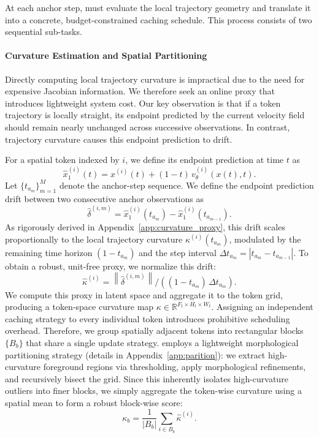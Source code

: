 At each anchor step, \cubic must evaluate the local trajectory geometry and translate it into a concrete, budget-constrained caching schedule. This process consists of two sequential sub-tasks.

\paragraph{Curvature Estimation and Spatial Partitioning}
Directly computing local trajectory curvature is impractical due to the need for expensive Jacobian information. We therefore seek an online proxy that introduces lightweight system cost. Our key observation is that if a token trajectory is locally straight, its endpoint predicted by the current velocity field should remain nearly unchanged across successive observations. In contrast, trajectory curvature causes this endpoint prediction to drift.

For a spatial token indexed by $i$, we define its endpoint prediction at time $t$ as
\begin{equation}
    \hat{x}_1^{(i)}(t) = x^{(i)}(t) + (1 - t)\, v_\theta^{(i)}(x(t), t).
\end{equation}
Let $\{t_{a_m}\}_{m=1}^{M}$ denote the anchor-step sequence. We define the endpoint prediction drift between two consecutive anchor observations as
\begin{equation}
    \hat{\delta}^{(i,m)} = \hat{x}_1^{(i)}(t_{a_m}) - \hat{x}_1^{(i)}(t_{a_{m-1}}).
\end{equation}
As rigorously derived in Appendix~\ref{app:curvature_proxy}, this drift scales proportionally to the local trajectory curvature $\kappa^{(i)}(t_{a_m})$, modulated by the remaining time horizon $(1-t_{a_m})$ and the step interval $\Delta t_{a_m} = |t_{a_m} - t_{a_{m-1}}|$. To obtain a robust, unit-free proxy, we normalize this drift:
\begin{equation}
    \hat{\kappa}^{(i)} = \left\|\hat{\delta}^{(i,m)}\right\|/((1-t_{a_m})\,\Delta t_{a_m}).
\end{equation}
We compute this proxy in latent space and aggregate it to the token grid, producing a token-space curvature map $\kappa \in \mathbb{R}^{F_t \times H_t \times W_t}.$ 
Assigning an independent caching strategy to every individual token introduces prohibitive scheduling overhead. Therefore, we group spatially adjacent tokens into rectangular blocks $\{B_b\}$ that share a single update strategy. \cubic employs a lightweight morphological partitioning strategy (details in Appendix~\ref{app:parition}): we extract high-curvature foreground regions via thresholding, apply morphological refinements, and recursively bisect the grid. Since this inherently isolates high-curvature outliers into finer blocks, we simply aggregate the token-wise curvature using a spatial mean to form a robust block-wise score:
\begin{equation}
    \kappa_b = \frac{1}{|B_b|} \sum_{i \in B_b} \hat{\kappa}^{(i)}.
\end{equation}

